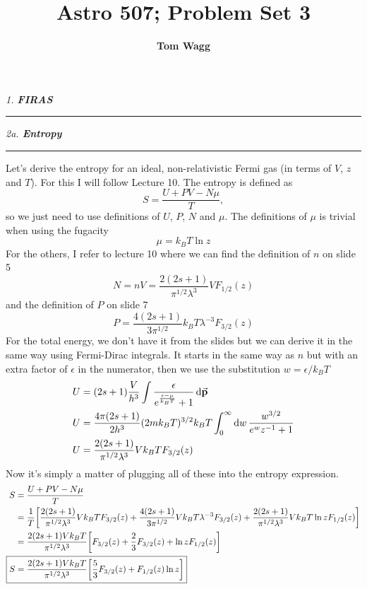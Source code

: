 \documentclass[12pt, letterpaper, twoside]{article}
\title{Astro 507; Problem Set 3}
\author{\textbf{Tom Wagg}}
\newcommand{\question}[1]{{\noindent \it #1}}
\newcommand{\answer}[1]{
    \par\noindent\rule{\textwidth}{0.4pt}#1\vspace{0.5cm}
}
\begin{document}
\maketitle

\question{1. \textbf{FIRAS}}

\answer{}

\question{2a. \textbf{Entropy}}
\answer{
    Let's derive the entropy for an ideal, non-relativistic Fermi gas (in terms of $V$, $z$ and $T$). For this I will follow Lecture 10. The entropy is defined as
    \begin{equation}
        S = \frac{U + PV - N \mu}{T},
    \end{equation}
    so we just need to use definitions of $U$, $P$, $N$ and $\mu$. The definitions of $\mu$ is trivial when using the fugacity
    \begin{equation}
        \mu = k_B T \ln z
    \end{equation}
    For the others, I refer to lecture 10 where we can find the definition of $n$ on slide 5
    \begin{equation}
        N = n V = \frac{2(2s + 1)}{\pi^{1/2} \lambda^3} V F_{1/2}(z)
    \end{equation}
    and the definition of $P$ on slide 7
    \begin{equation}
        P = \frac{4(2s + 1)}{3 \pi^{1/2}} k_B T \lambda^{-3} F_{3/2}(z)
    \end{equation}
    For the total energy, we don't have it from the slides but we can derive it in the same way using Fermi-Dirac integrals. It starts in the same way as $n$ but with an extra factor of $\epsilon$ in the numerator, then we use the substitution $w = \epsilon / k_B T$
    \begin{align}
        U &= (2s + 1) \frac{V}{h^3} \int \frac{\epsilon}{e^{\frac{\epsilon - \mu}{k_B T}} + 1} \dd{\va{p}} \\
        U &= \frac{4\pi (2s + 1)}{2 h^3} (2 m k_B T)^{3/2} k_B T \int_0^\infty \dd{w} \frac{w^{3/2}}{e^w z^{-1} + 1} \\
        U &= \frac{2(2s + 1)}{\pi^{1/2} \lambda^3} V k_B T F_{3/2}(z)
    \end{align}
    Now it's simply a matter of plugging all of these into the entropy expression.
    \begin{align}
        S &= \frac{U + PV - N \mu}{T} \\
          &= \frac{1}{T} \qty[ \frac{2(2s + 1)}{\pi^{1/2} \lambda^3} V k_B T F_{3/2}(z) + \frac{4(2s + 1)}{3 \pi^{1/2}} V k_B T \lambda^{-3} F_{3/2}(z) + \frac{2(2s + 1)}{\pi^{1/2} \lambda^3} V k_B T \ln z F_{1/2}(z)] \\
          &= \frac{2(2s + 1) V k_B T}{\pi^{1/2} \lambda^3} \qty[ F_{3/2}(z) + \frac{2}{3} F_{3/2}(z) + \ln z F_{1/2}(z)] \\
        \Aboxed{ S &= \frac{2(2s + 1) V k_B T}{\pi^{1/2} \lambda^3} \qty[ \frac{5}{3} F_{3/2}(z) + F_{1/2}(z) \ln z] }
    \end{align}
}
\end{document}
